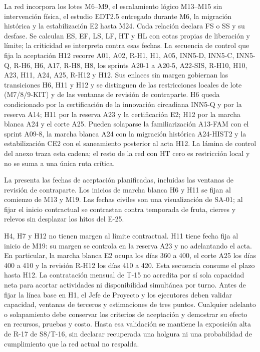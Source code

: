 La red incorpora los lotes M6--M9, el escalamiento lógico M13--M15 sin intervención física,
el estudio EDT2.5 entregado durante M6, la migración histórica y la estabilización E2 hasta M24.
Cada relación declara FS o SS y su desfase. Se calculan ES, EF, LS, LF, HT y HL con cotas
propias de liberación y límite; la criticidad se interpreta contra esas fechas. La secuencia de
control que fija la aceptación H12 recorre A01, A02, R-H1, H1, A05, INN5-D, INN5-C, INN5-Q, R-H6, H6, A17, R-H8, H8, los sprints A20-1 a A20-5, A22-SIS, R-H10, H10, A23, H11, A24, A25, R-H12 y H12. Sus
enlaces sin margen gobiernan las transiciones H6, H11 y H12 y se distinguen de las restricciones
locales de lote (M7/8/9-KIT) y de las ventanas de revisión de contraparte. H6 queda condicionado
por la certificación de la innovación circadiana INN5-Q y por la reserva A14; H11 por la reserva
A23 y la certificación E2; H12 por la marcha blanca A24 y el corte A25. Pueden solaparse la
familiarización A13-FAM con el sprint A09-8, la marcha blanca A24 con la migración histórica
A24-HIST2 y la estabilización CE2 con el saneamiento posterior al acta H12. La lámina de control
del anexo traza esta cadena; el resto de la red con HT cero es restricción local y no se suma a
una única ruta crítica.

La  presenta las fechas de aceptación planificadas, incluidas las ventanas de
revisión de contraparte. Los inicios de marcha blanca H6 y H11 se fijan al comienzo de M13 y M19.
Las fechas civiles son una visualización de SA-01; al fijar el inicio contractual se contrastan
contra temporada de fruta, cierres y relevos sin desplazar los hitos del E-25.



H4, H7 y H12 no tienen margen al límite contractual. H11 tiene fecha fija al inicio de M19:
su margen se controla en la reserva A23 y no adelantando el acta. En particular, la marcha blanca
E2 ocupa los días 360 a 400, el corte A25 los días 400 a 410 y la revisión R-H12 los días 410 a 420.
Esta secuencia consume el plazo hasta H12. La contratación mensual de T-15 no acredita por sí
sola capacidad neta para acortar actividades ni disponibilidad simultánea por turno.
Antes de fijar la línea base en H1, el Jefe de Proyecto y los ejecutores deben validar capacidad,
ventanas de terceros y estimaciones de tres puntos. Cualquier adelanto o solapamiento debe
conservar los criterios de aceptación y demostrar su efecto en recursos, pruebas y costo.
Hasta esa validación se mantiene la exposición alta de R-17 de S8/T-16, sin declarar recuperada
una holgura ni una probabilidad de cumplimiento que la red actual no respalda.

